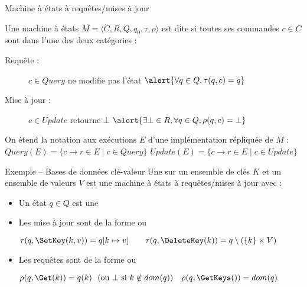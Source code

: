 
\begingroup


\begin{frame}{Machine à états à requêtes/mises à jour}

  Une machine à états $M=\langle C, R, Q, q_0, \tau, \rho \rangle$ est dite  si
  toutes ses commandes $c\in C$ sont dans l'une des deux catégories : 
  \begin{description}
  \item[Requête :] \alert{$c \in \mathit{Query}$} ne modifie pas l'état
    \hfill $\alert{\forall q\in Q, \tau(q, c) = q}$\\
  \item[Mise à jour :] \alert{$c \in \mathit{Update}$} retourne $\bot$
    \hfill $\alert{\exists \bot\in R, \forall q\in Q, \rho(q, c) = \bot}$\\
  \end{description}

  \vspace{2mm}
  On étend la notation aux exécutions $E$ d'une implémentation répliquée de $M$ :
  \alert{$\mathit{Query}(E) = \{ c\rightarrow r \in E \mid c \in \mathit{Query} \}$ \hfill $\mathit{Update}(E) = \{ c\rightarrow r \in E \mid c \in \mathit{Update} \}$}

  \pause
  \vspace{2mm}

  \begin{exampleblock}{Exemple -- Bases de données clé-valeur}
    Une  sur un ensemble de clés $K$ et un ensemble de valeurs $V$
    est une machine à états à requêtes/mises à jour avec : 
    \begin{itemize}
    \item Un état $q\in Q$ est une 
    \item Les mise à jour sont de la forme  ou 
      \begin{center}
        $\tau(q, \SetKey(k,v)) = q[k \mapsto v]  \quad\quad \tau(q, \DeleteKey(k)) = q \setminus (\{k\}\times V)$
      \end{center}
    \item Les requêtes sont de la forme  ou \example{$\GetKeys()$}
      \begin{center}
        $\rho(q, \Get(k)) = q(k) ~~ (\text{ou } \bot \text{ si } k \notin dom(q))  \quad \rho(q, \GetKeys()) = dom(q)$
      \end{center}
    \end{itemize}
  \end{exampleblock}

\end{frame}

\endgroup
\endinput
